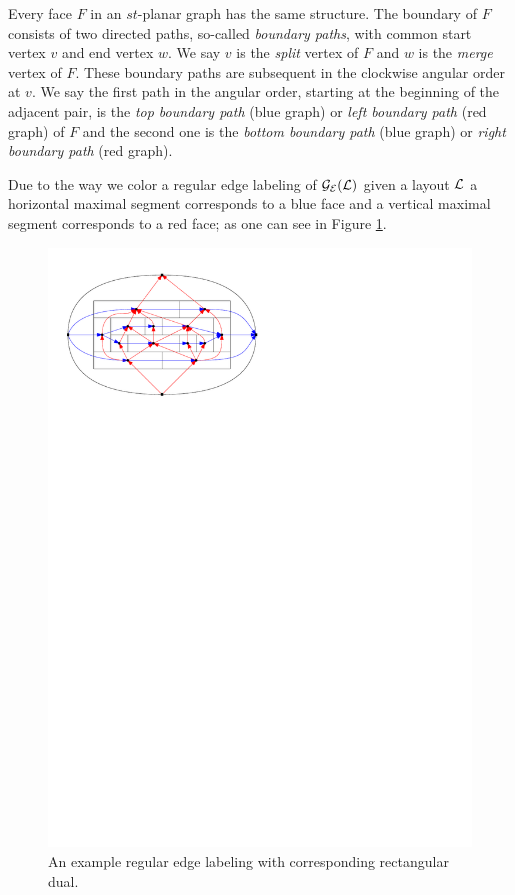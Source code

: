     Every face $F$ in an $st$-planar graph has the same structure. The boundary of $F$ consists of two directed paths, so-called \emph{boundary paths}, with common start vertex $v$ and end vertex $w$. We say $v$ is the \emph{split} vertex of $F$ and $w$ is the \emph{merge} vertex of $F$.
    These boundary paths are subsequent in the clockwise angular order at $v$. We say the first path in the angular order, starting at the beginning of the adjacent pair, is the \emph{top boundary path} (blue graph) or \emph{left boundary path} (red graph) of $F$ and the second one is the \emph{bottom boundary path} (blue graph) or \emph{right boundary path} (red graph).


    Due to the way we color a regular edge labeling of $\mathcal{G}_{\mathcal{E}}(\mathcal{L})$ given a layout $\mathcal{L}$ a horizontal maximal segment corresponds to a blue face and a vertical maximal segment corresponds to a red face; as one can see in Figure \ref{fig:rect:relSegmentFace}.

    \begin{figure}[t]
      \centering
      \includegraphics[scale=1]{rectangularDuals/img/relSegmentFaceRescale}
      \caption{An example regular edge labeling with corresponding rectangular dual.}
      \label{fig:rect:relSegmentFace}
    \end{figure}

